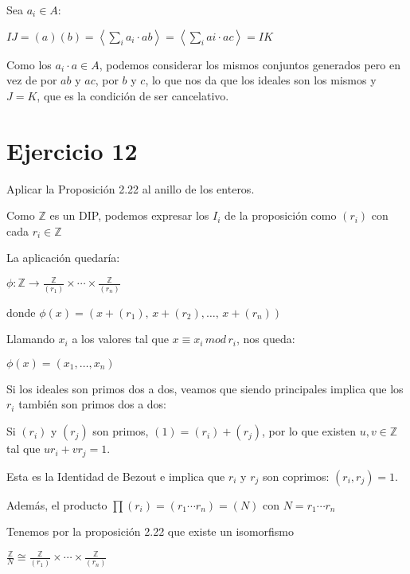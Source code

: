 \documentclass[10pt,a4paper]{article}
\begin{document}
	Sea $a_i \in A$:
	
	$IJ = (a)(b) = \left\langle  \sum_i a_i \cdot ab \right\rangle = \left\langle  \sum_i ai \cdot ac \right\rangle  = IK$
	
	Como los $a_i\cdot a \in A$, podemos considerar los mismos conjuntos generados pero en vez de por $ab$ y $ac$, por $b$ y $c$, lo que nos da que los ideales son los mismos y $J=K$, que es la condición de ser cancelativo.
	
	
	
	
	
	
	\section*{Ejercicio 12}
	
	Aplicar la Proposición 2.22 al anillo de los enteros.
	
	\hfill
	
	
	Como $\mathbb{Z}$ es un DIP, podemos expresar los $I_i$ de la proposición como $(r_i)$ con cada $r_i \in \mathbb{Z}$
	
	La aplicación quedaría:
	
	$ \phi \colon \mathbb{Z} \rightarrow \frac{\mathbb{Z}}{(r_1)} \times \cdots \times \frac{\mathbb{Z}}{(r_n)} $
	
	
	donde $ \phi \left( x  \right) = ( x+(r_1) ,\, x+(r_2), \ldots,\, x+(r_n) )  $
	
	
	Llamando $ x_i $ a los valores tal que $ x \equiv x_i\, mod\, r_i$, nos queda:
	
	$ \phi \left( x  \right) = ( x_1, \ldots, x_n )  $
	
	\hfil 
	
	Si los ideales son primos dos a dos, veamos que siendo principales implica que los $r_i$ también son primos dos a dos:
	
	Si $(r_i)$ y $(r_j)$ son primos, $(1) = (r_i) + (r_j)$, por lo que existen $u, v \in \mathbb{Z} $ tal que $ ur_i + vr_j = 1$.
	
	Esta es la Identidad de Bezout e implica que $r_i$ y $r_j$ son coprimos: $(r_i, r_j) =1 $.
	
	
	\hfil
	
	Además, el producto $\prod (r_i) = (r_1 \cdots r_n) = (N)$ con $N = r_1\cdots r_n$
	
	Tenemos por la proposición 2.22 que existe un isomorfismo 
	
	$\frac{\mathbb{Z}}{N} \cong  \frac{\mathbb{Z}}{(r_1)} \times \cdots \times \frac{\mathbb{Z}}{(r_n)}$
	
\end{document}
